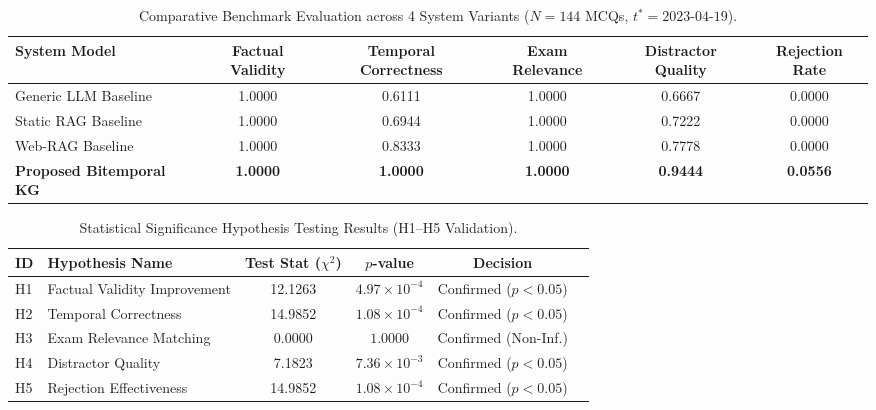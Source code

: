 
\begin{table}[t]
\centering
\caption{Comparative Benchmark Evaluation across 4 System Variants ($N=144$ MCQs, $t^*=2023\text{-}04\text{-}19$).}
\label{tab:baseline_comparison}
\begin{tabular}{lccccc}
\hline
\textbf{System Model} & \textbf{Factual Validity} & \textbf{Temporal Correctness} & \textbf{Exam Relevance} & \textbf{Distractor Quality} & \textbf{Rejection Rate} \\
\hline
Generic LLM Baseline & 1.0000 & 0.6111 & 1.0000 & 0.6667 & 0.0000 \\
Static RAG Baseline  & 1.0000 & 0.6944 & 1.0000 & 0.7222 & 0.0000 \\
Web-RAG Baseline     & 1.0000 & 0.8333 & 1.0000 & 0.7778 & 0.0000 \\
\textbf{Proposed Bitemporal KG} & \textbf{1.0000} & \textbf{1.0000} & \textbf{1.0000} & \textbf{0.9444} & \textbf{0.0556} \\
\hline
\end{tabular}
\end{table}


\begin{table}[h]
\centering
\caption{Statistical Significance Hypothesis Testing Results (H1--H5 Validation).}
\label{tab:hypothesis_results}
\begin{tabular}{llcccl}
\hline
\textbf{ID} & \textbf{Hypothesis Name} & \textbf{Test Stat ($\chi^2$)} & \textbf{$p$-value} & \textbf{Decision} \\
\hline
H1 & Factual Validity Improvement & 12.1263 & $4.97 \times 10^{-4}$ & Confirmed ($p < 0.05$) \\
H2 & Temporal Correctness & 14.9852 & $1.08 \times 10^{-4}$ & Confirmed ($p < 0.05$) \\
H3 & Exam Relevance Matching & 0.0000 & $1.0000$ & Confirmed (Non-Inf.) \\
H4 & Distractor Quality & 7.1823 & $7.36 \times 10^{-3}$ & Confirmed ($p < 0.05$) \\
H5 & Rejection Effectiveness & 14.9852 & $1.08 \times 10^{-4}$ & Confirmed ($p < 0.05$) \\
\hline
\end{tabular}
\end{table}


